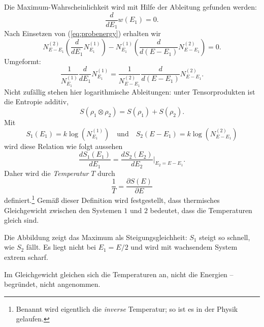 Die Maximum-Wahrscheinlichkeit wird mit Hilfe der Ableitung gefunden werden:
\begin{equation}
	\frac{d}{dE_1} w(E_1) = 0.
\end{equation}
Nach Einsetzen von (\ref{eq:probenergy}) erhalten wir
\begin{equation}
	N_{E-E_1}^{(2)}\left(\frac{d}{dE_1}N_{E_1}^{(1)}\right) - N_{E_1}^{(1)}\left(\frac{d}{d(E-E_1)}N_{E-E_1}^{(2)}\right) = 0.
\end{equation}
Umgeformt:
\begin{equation}
	\frac{1}{N_{E_1}^{(1)}}\frac{d}{dE_1}N_{E_1}^{(1)} =  \frac{1}{N_{E-E_1}^{(2)}}\frac{d}{d(E-E_1)}N_{E-E_1}^{(2)}.
\end{equation}
Nicht zufällig stehen hier logarithmische Ableitungen: unter Tensorprodukten ist die Entropie additiv,
\begin{equation}
	S(\rho_1\otimes \rho_2) = S(\rho_1)+S(\rho_2).
\end{equation}
Mit 
\begin{equation}
	S_1(E_1) = k\log(N_{E_1}^{(1)})\quad \text{und} \quad S_2(E-E_1) = k\log(N_{E-E_1}^{(2)})
\end{equation}
wird diese Relation wie folgt aussehen
\begin{equation}
	\frac{dS_1(E_1)}{dE_1} = \frac{dS_2(E_2)}{dE_2}\bigg|_{E_2 = E-E_1}.
\end{equation}
Daher wird die \emph{Temperatur} $T$ durch 
\begin{equation}
	\frac{1}{T} = \frac{\partial S(E)}{\partial E}
\end{equation}
definiert.\footnote{Benannt wird eigentlich die \emph{inverse} Temperatur; so ist es in der Physik gelaufen.} Gemäß dieser Definition wird festgestellt, dass thermisches Gleichgewicht zwischen den Systemen $1$ und $2$ bedeutet, dass die Temperaturen gleich sind.



Die Abbildung zeigt das Maximum als Steigungsgleichheit: $S_1$ steigt so schnell, wie $S_2$ fällt. Es liegt nicht bei $E_1=E/2$ und wird mit wachsendem System extrem scharf.

\begin{merksatz}
	Im Gleichgewicht gleichen sich die Temperaturen an, nicht die Energien -- begründet, nicht angenommen.
\end{merksatz}
